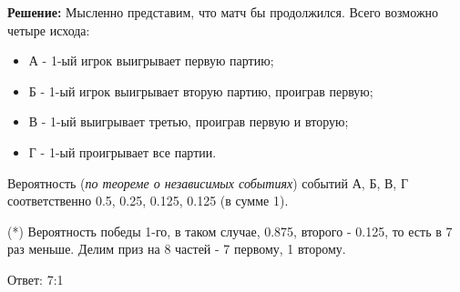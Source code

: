 \documentclass[../Main.tex]{subfiles}
\begin{document}
\textbf{Решение:} Мысленно представим, что матч бы продолжился. Всего возможно четыре исхода: 
\begin{itemize}
    \item А - 1-ый игрок выигрывает первую партию;
    \item Б - 1-ый игрок выигрывает вторую партию, проиграв первую;
    \item В - 1-ый выигрывает третью, проиграв первую и вторую;
    \item Г - 1-ый проигрывает все партии.
\end{itemize}

Вероятность (\textit{по теореме о независимых событиях}) событий А, Б, В, Г соответственно 0.5, 0.25, 0.125, 0.125 (в сумме 1). 

(*) Вероятность победы 1-го, в таком случае, 0.875, второго - 0.125, то есть в 7 раз меньше. Делим приз на 8 частей - 7 первому, 1 второму.

Ответ: 7:1
\end{document}

